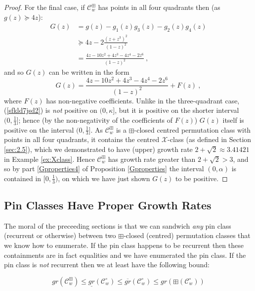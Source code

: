 \documentclass[11pt,a4paper]{article}
\theoremstyle{definition}
\begin{document}
\begin{proof}
For the final case, if $\mathcal{C}^{\boxplus}_{w}$ has points in all four quadrants then (as $g(z) \succeq 4z$):
\begin{equation}
\begin{split}
G(z) & = g(z) - g_{1}(z)g_{3}(z) - g_{2}(z)g_{4}(z)\\
 & \succeq 4z - 2\frac{(z+z^3)^2}{(1-z)^2} \\
 & = \frac{4z - 10z^2 + 4z^3 - 4z^4 - 2z^6}{(1-z)^2} \ , \label{sfkld7jsd2}
\end{split}
\end{equation}
and so $G(z)$ can be written in the form
\[
G(z) = \frac{4z - 10z^2 + 4z^3 - 4z^4 - 2z^6}{(1-z)^2} + F(z) \ ,
\]
where $F(z)$ has non-negative coefficients. Unlike in the three-quadrant case, (\ref{sfkld7jsd2}) is \emph{not} positive on $(0,\kappa]$, but it is positive on the shorter interval $(0,\frac{1}{3}]$; hence (by the non-negativity of the coefficients of $F(z)$) $G(z)$ itself is positive on the interval $(0,\frac{1}{3}]$. As $\mathcal{C}^{\boxplus}_{w}$ is a $\boxplus$-closed centred permutation class with points in all four quadrants, it contains the centred $\mathcal{X}$-class (as defined in Section \ref{sec:2.5}), which we demonstrated to have (upper) growth rate $2 + \sqrt{2} \approx 3.41421$ in Example \ref{ex:Xclass}. Hence $\mathcal{C}^{\boxplus}_{w}$ has growth rate greater than $2 + \sqrt{2} > 3$, and so by part \ref{Gproperties4} of Proposition \ref{Gproperties} the interval $(0,\alpha)$ is contained in $[0,\frac{1}{3})$, on which we have just shown $G(z)$ to be positive. \qedhere
 \end{proof}

\subsection{Pin Classes Have Proper Growth Rates} \label{sec:4.3}

The moral of the preceeding sections is that we can sandwich \emph{any} pin class (recurrent or otherwise) between two $\boxplus$-closed (centred) permutation classes that we know how to enumerate. If the pin class happens to be recurrent then these containments are in fact equalities and we have enumerated the pin class. If the pin class is \emph{not} recurrent then we at least have the following bound:

\begin{equation} \label{conts}
gr(\mathcal{C}^{\boxplus}_{w}) \leq \underline{gr}(\mathcal{C}^{\circ}_{w}) \leq \overline{gr}(\mathcal{C}^{\circ}_{w}) \leq gr(\boxplus(\mathcal{C}^{\circ}_{w}))
\end{equation}
\end{document}
